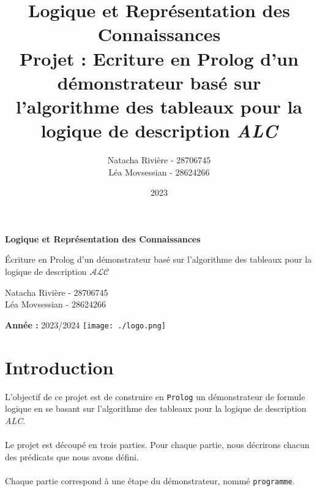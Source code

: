 \documentclass{article}
\title{Logique et Représentation des Connaissances \\ Projet : Ecriture en Prolog d'un démonstrateur basé sur l'algorithme des tableaux pour la logique de description \textit{ALC}}
\author{\Large{Natacha Rivière - 28706745} \\ \Large{Léa Movsessian - 28624266}}
\date{\Large{2023}}
\newcommand{\code}[1]{\colorbox{light-gray}{\texttt{#1}}}
\begin{document}
\begin{titlepage}
    \begin{center}
        \vspace*{1cm}

        \Huge
        \textbf{Logique et Représentation des Connaissances}

        \vspace{0.5cm}
        \LARGE
        Écriture en Prolog d'un démonstrateur basé sur l'algorithme des tableaux pour la logique de description  $ \mathcal{ALC}$

        \vspace{1.5cm}

        Natacha Rivière - 28706745\\
        Léa Movsessian - 28624266

        \vfill



        \normalsize

        \textbf{Année :}
        2023/2024
        \hfill
        \texttt{[image: ./logo.png]}
    \end{center}
\end{titlepage}

\clearpage
\renewcommand{\contentsname}{Table des matières}
\tableofcontents
\clearpage

\section{Introduction}
L'objectif de ce projet est de construire en \code{Prolog} un démonstrateur de formule logique en se basant sur l'algorithme des tableaux pour la logique de description \textit{ALC}.
\\\\
Le projet est découpé en trois parties. Pour chaque partie, nous décrirons chacun des  prédicats que nous avons défini.
\\\\
Chaque partie correspond à une étape du démonstrateur, nommé \code{programme}.
\end{document}
